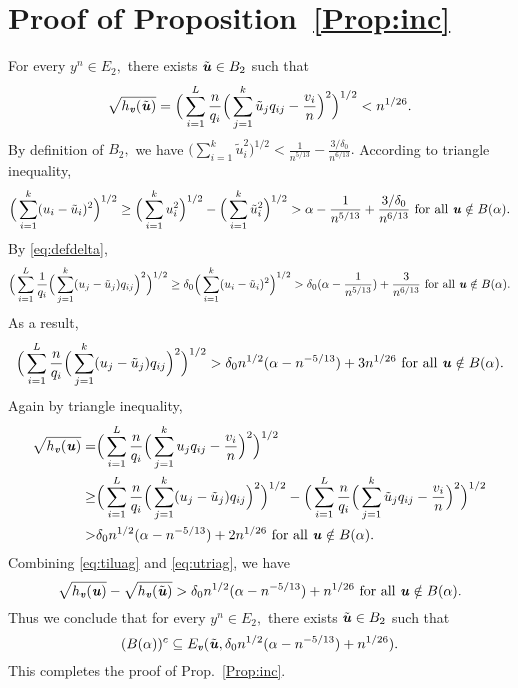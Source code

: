 \documentclass[11pt,onecolumn]{IEEEtran}
\def\mathbi#1{{\textbf{\textit #1}}}
\begin{document}
\section{Proof of Proposition~\ref{Prop:inc}}\label{ap:inc}
For every $y^n \in E_2,$ there exists $\tilde{\mathbi{u}} \in B_2$ such that
\begin{equation}\label{eq:tiluag}
 \sqrt{h_{\mathbi{v}}(\tilde{\mathbi{u}})}= \Big(\sum_{i=1}^L \frac{n}{q_i} \Big(\sum_{j=1}^k \tilde{u}_j q_{ij} - \frac{v_i}{n} \Big)^2 \Big)^{1/2} < n^{1/26}.
\end{equation}
By definition of $B_2,$ we have $\Big(\sum_{i=1}^k \tilde{u}_i^2 \Big)^{1/2} < \frac{1}{n^{5/13}} - \frac{3/\delta_0}{n^{6/13}}.$ According to triangle inequality,
$$
\Big(\sum_{i=1}^k (u_i - \tilde{u}_i)^2 \Big)^{1/2} \ge 
\Big(\sum_{i=1}^k u_i^2 \Big)^{1/2} - \Big(\sum_{i=1}^k \tilde{u}_i^2 \Big)^{1/2}
> \alpha - \frac{1}{n^{5/13}}+ \frac{3/\delta_0}{n^{6/13}} \text{~for all~}
\mathbi{u} \notin B(\alpha).
$$
By \eqref{eq:defdelta},
$$
\Big(\sum_{i=1}^L \frac{1}{q_i} \Big(\sum_{j=1}^k (u_j - \tilde{u}_j) q_{ij} \Big)^2\Big)^{1/2}
\ge \delta_0 \Big(\sum_{i=1}^k (u_i - \tilde{u}_i)^2 \Big)^{1/2}
> \delta_0 (\alpha - \frac{1}{n^{5/13}} ) + \frac{3}{n^{6/13}} \text{~for all~}
\mathbi{u} \notin B(\alpha).
$$
As a result,
$$
\Big(\sum_{i=1}^L \frac{n}{q_i} \Big(\sum_{j=1}^k (u_j - \tilde{u}_j) q_{ij} \Big)^2\Big)^{1/2}
> \delta_0 n^{1/2} (\alpha - n^{-5/13} ) + 3 n^{1/26} \text{~for all~}
\mathbi{u} \notin B(\alpha).
$$
Again by triangle inequality,
\begin{equation}\label{eq:utriag}
\begin{aligned}
 \sqrt{h_{\mathbi{v}}(\mathbi{u})} = & \Big(\sum_{i=1}^L \frac{n}{q_i} \Big(\sum_{j=1}^k u_j q_{ij} - \frac{v_i}{n} \Big)^2 \Big)^{1/2} \\
\ge & \Big(\sum_{i=1}^L \frac{n}{q_i} \Big(\sum_{j=1}^k (u_j - \tilde{u}_j) q_{ij} \Big)^2\Big)^{1/2} -
\Big(\sum_{i=1}^L \frac{n}{q_i} \Big(\sum_{j=1}^k \tilde{u}_j q_{ij} - \frac{v_i}{n} \Big)^2 \Big)^{1/2} \\
> & \delta_0 n^{1/2} (\alpha - n^{-5/13} ) + 2 n^{1/26} \text{~for all~}
\mathbi{u} \notin B(\alpha).
\end{aligned}
\end{equation}
Combining \eqref{eq:tiluag} and \eqref{eq:utriag}, we have
$$
 \sqrt{h_{\mathbi{v}}(\mathbi{u})} - \sqrt{h_{\mathbi{v}}(\tilde{\mathbi{u}})} >
\delta_0 n^{1/2} (\alpha - n^{-5/13} ) + n^{1/26}  \text{~for all~}
\mathbi{u} \notin B(\alpha).
$$
Thus we conclude that for every $y^n \in E_2,$ there exists $\tilde{\mathbi{u}} \in B_2$ such that
$$
(B(\alpha))^c \subseteq E_{\mathbi{v}}(\tilde{\mathbi{u}}, \delta_0 n^{1/2} (\alpha - n^{-5/13} ) + n^{1/26}).
$$
This completes the proof of Prop.~\ref{Prop:inc}.
\end{document}
